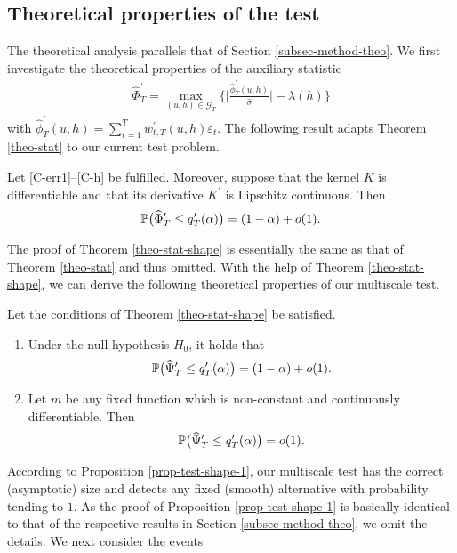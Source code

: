 \documentclass[a4paper,12pt]{article}
\numberwithin{equation}{section}
\begin{document}
\subsection{Theoretical properties of the test}\label{subsec-test-shape-theo}


The theoretical analysis parallels that of Section \ref{subsec-method-theo}. We first investigate the theoretical properties of the auxiliary statistic 
\begin{align*}
\widehat{\Phi}_T^\prime = \max_{(u,h) \in \mathcal{G}_T} \Big\{ \Big| \frac{\widehat{\phi}_T^\prime(u,h)}{\widehat{\sigma}} \Big| - \lambda(h) \Big\} 
\end{align*}
with $\widehat{\phi}_T^\prime(u,h) = \sum_{t=1}^T w_{t,T}^\prime(u,h) \varepsilon_t$. The following result adapts Theorem \ref{theo-stat} to our current test problem. 
\begin{theorem}\label{theo-stat-shape}
Let \ref{C-err1}--\ref{C-h} be fulfilled. Moreover, suppose that the kernel $K$ is differentiable and that its derivative $K^\prime$ is Lipschitz continuous. Then
\[ \mathbb{P} \big( \widehat{\Phi}_T^\prime \le q_T^\prime(\alpha) \big) = (1 - \alpha) + o(1). \]
\end{theorem}
The proof of Theorem \ref{theo-stat-shape} is essentially the same as that of Theorem \ref{theo-stat} and thus omitted. With the help of Theorem \ref{theo-stat-shape}, we can derive the following theoretical properties of our multiscale test. 
\begin{prop}\label{prop-test-shape-1}
Let the conditions of Theorem \ref{theo-stat-shape} be satisfied. 
\begin{enumerate}[label=(\alph*),leftmargin=0.75cm]
\item Under the null hypothesis $H_0$, it holds that 
\[ \mathbb{P} \big( \widehat{\Psi}_T^\prime \le q_T^\prime(\alpha) \big) = (1 - \alpha) + o(1). \]
\item Let $m$ be any fixed function which is non-constant and continuously differentiable. Then 
\[ \mathbb{P} \big( \widehat{\Psi}_T^\prime \le q_T^\prime(\alpha) \big) = o(1). \]
\end{enumerate}
\end{prop}
According to Proposition \ref{prop-test-shape-1}, our multiscale test has the correct (asymptotic) size and detects any fixed (smooth) alternative with probability tending to $1$. As the proof of Proposition \ref{prop-test-shape-1} is basically identical to that of the respective results in Section \ref{subsec-method-theo}, we omit the details. We next consider the events
\end{document}
